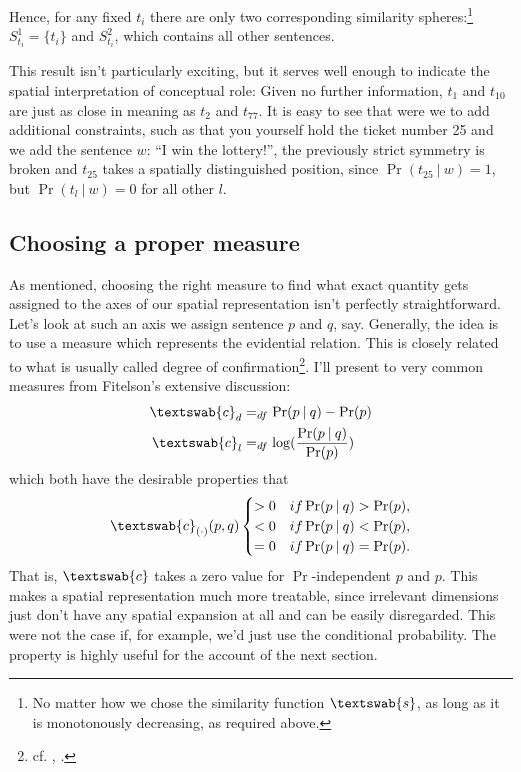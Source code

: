 \documentclass[11pt, a4paper]{scrartcl}
\newcommand{\m}[1]{\textswab{#1}}
\newcommand{\given}[1][]{\:#1\vert\:}
\begin{document}
Hence, for any fixed $t_i$ there are only two corresponding similarity spheres:\footnote{No matter how we chose the similarity function $\m{s}$, as long as it is monotonously decreasing, as required above.} $S^1_{t_i} = \{ t_i\}$ and $S^2_{t_i}$, which contains all other sentences. 

This result isn't particularly exciting, but it serves well enough to indicate the spatial interpretation of conceptual role: Given no further information, $t_1$ and $t_{10}$ are just as close in meaning as $t_2$ and $t_{77}$. It is easy to see that were we to add additional constraints, such as that you yourself hold the ticket number 25 and we add the sentence $w$: ``I win the lottery!'', the previously strict symmetry is broken and $t_{25}$ takes a spatially distinguished position, since $\Pr(t_{25} \given w) = 1$, but $\Pr(t_l \given w) = 0$ for all other $l$. 

\subsection{Choosing a proper measure}\label{sec:choosing}

As mentioned, choosing the right measure to find what exact quantity gets assigned to the axes of our spatial representation isn't perfectly straightforward. Let's look at such an axis we assign sentence $p$ and $q$, say. Generally, the idea is to use a measure which represents the evidential relation. This is closely related to what is usually called degree of confirmation\footnote{cf. \textcite{Fitelson1999-FITTPO-3}, \textcite{Broessel2013}.}. I'll present to very common measures from Fitelson's extensive discussion: 
\begin{align*}
    \m{c}_d &=_{df} \Pr(p\given q) - \Pr(p)\\
    \m{c}_l &=_{df} \log(\frac{\Pr(p\given q)}{\Pr(p)})
\end{align*}
which both have the desirable properties that
\[
\m{c}_{(\cdot)}(p, q) 
    \begin{cases} 
        > 0 & if \Pr(p \given q) > \Pr(p),\\
        < 0 & if \Pr(p \given q) < \Pr(p),\\
        = 0 & if \Pr(p \given q) = \Pr(p).
    \end{cases}
\]
That is, $\m{c}$ takes a zero value for $\Pr$-independent $p$ and $p$. This makes a spatial representation much more treatable, since irrelevant dimensions just don't have any spatial expansion at all and can be easily disregarded. This were not the case if, for example, we'd just use the conditional probability. The property is highly useful for the account of the next section. 
\end{document}
